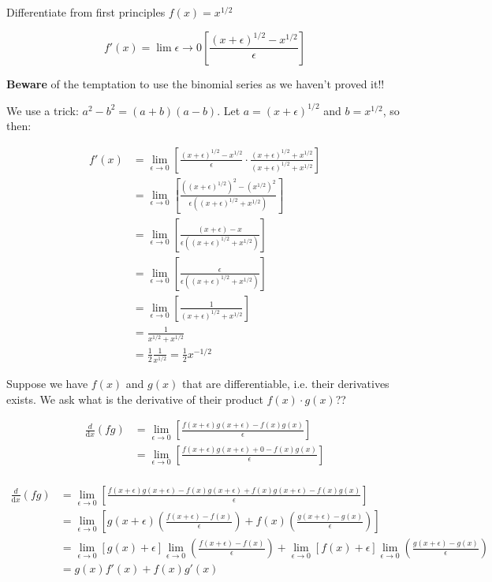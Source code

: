 \documentclass[10pt]{scrartcl}
\begin{document}
\begin{example}
Differentiate from first principles $f(x) = x^{1/2}$

\[f'(x) = \lim{\epsilon \to 0}\left[\frac{(x+\epsilon)^{1/2} - x^{1/2}}{\epsilon}\right]\]	

\textbf{Beware} of the temptation to use the binomial series as we haven't proved it!!

We use a trick: $a^2 -b^2 = (a+b)(a-b)$. Let $a = (x + \epsilon)^{1/2}$ and $b = x^{1/2}$, so then:

\[
\begin{aligned}
  f'(x) &= \lim_{\epsilon \to 0}\left[\frac{(x+\epsilon)^{1/2} - x^{1/2}}{\epsilon}\cdot \frac{(x+\epsilon)^{1/2} + x^{1/2}}{(x+\epsilon)^{1/2} + x^{1/2}}\right]\\
  &= \lim_{\epsilon \to 0}\left[\frac{((x+\epsilon)^{1/2})^2 - (x^{1/2})^2}{\epsilon((x+\epsilon)^{1/2} + x^{1/2})}\right]\\
  &= \lim_{\epsilon \to 0} \left[\frac{(x+\epsilon) - x}{\epsilon((x+\epsilon)^{1/2} + x^{1/2})}\right]\\
  &= \lim_{\epsilon \to 0}\left[\frac{\epsilon}{\epsilon((x + \epsilon)^{1/2} + x^{1/2})}\right]\\
  &= \lim_{\epsilon \to 0} \left[\frac{1}{(x + \epsilon)^{1/2} + x^{1/2}}\right]\\
  &= \frac{1}{x^{1/2} + x^{1/2}}\\ 
  &= \frac{1}{2}\frac{1}{x^{1/2}} = \frac{1}{2}x^{-1/2}
\end{aligned}
\]
\end{example}\vspace*{5pt}


Suppose we have $f(x)$ and $g(x)$ that are differentiable, i.e. their derivatives exists. We ask what is the derivative of their product $f(x)\cdot g(x)$??


\[
\begin{aligned}
  \frac{d}{\mathrm{d}x}(fg) &= \lim_{\epsilon \to 0}\left[\frac{f(x +\epsilon)g(x+\epsilon)-f(x)g(x)}{\epsilon}\right]\\
  &= \lim_{\epsilon \to 0}\left[\frac{f(x +\epsilon)g(x+\epsilon) +0 -f(x)g(x)}{\epsilon}\right]\\
\end{aligned}
\]


\[
\begin{aligned}
   \frac{d}{\mathrm{d}x}(fg) &= \lim_{\epsilon \to 0}\left[\frac{f(x +\epsilon)g(x+\epsilon) - f(x)g(x+\epsilon) + f(x)g(x + \epsilon) -f(x)g(x)}{\epsilon}\right]\\[0.2cm]
  &= \lim_{\epsilon \to 0}\left[g(x+\epsilon)\left(\frac{f(x+\epsilon)-f(x)}{\epsilon}\right) + f(x)\left(\frac{g(x+\epsilon) -g(x)}{\epsilon}\right)\right]\\[0.2cm]
  &= \lim_{\epsilon \to 0}[g(x)+\epsilon]\lim_{\epsilon \to 0}\left(\frac{f(x+\epsilon)-f(x)}{\epsilon}\right) +  \lim_{\epsilon \to 0}[f(x)+\epsilon]\lim_{\epsilon \to 0}\left(\frac{g(x+\epsilon)-g(x)}{\epsilon}\right) \\[0.2cm]
  &= g(x)f'(x) + f(x)g'(x)
\end{aligned}
\]
\end{document}
